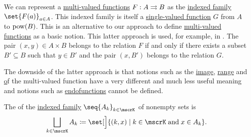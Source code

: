 \begin{remark}\label{rem:multi_valued_functions}
  We can represent a \hyperref[def:multi_valued_function]{multi-valued functions} \( F: A \rightrightarrows B \) as the \hyperref[def:indexed_family]{indexed family} \( \set{ F(a) }_{a \in A} \). This indexed family is itself a \hyperref[def:function]{single-valued function} \( G \) from \( A \) to \( \operatorname{pow}(B) \). This is an alternative to our approach to define \hyperref[def:multi_valued_function]{multi-valued functions} as a basic notion. This latter approach is used, for example, in \cite[def. 2.3]{Phelps1993}. The pair \( (x, y) \in A \times B \) belongs to the relation \( F \) if and only if there exists a subset \( B' \subseteq B \) such that \( y \in B' \) and the pair \( (x, B') \) belongs to the relation \( G \).

  The downside of the latter approach is that notions such as the \hyperref[def:multi_valued_function/image]{image}, \hyperref[def:multi_valued_function/range]{range} and \hyperref[def:multi_valued_function/inverse] of the multi-valued function have a very different and much less useful meaning and notions such as \hyperref[def:multi_valued_function/endofunction]{endofunctions} cannot be defined.
\end{remark}

\begin{definition}\label{def:disjoint_union}
  The  of the \hyperref[def:indexed_family]{indexed family} \( \seq{ A_k }_{k \in \mscrK} \) of nonempty sets is
  \begin{equation*}
    \bigsqcup_{k \in \mscrK} A_k \coloneqq \set[\Big]{ (k, x) \given k \in \mscrK \T{and} x \in A_k }.
  \end{equation*}
\end{definition}


